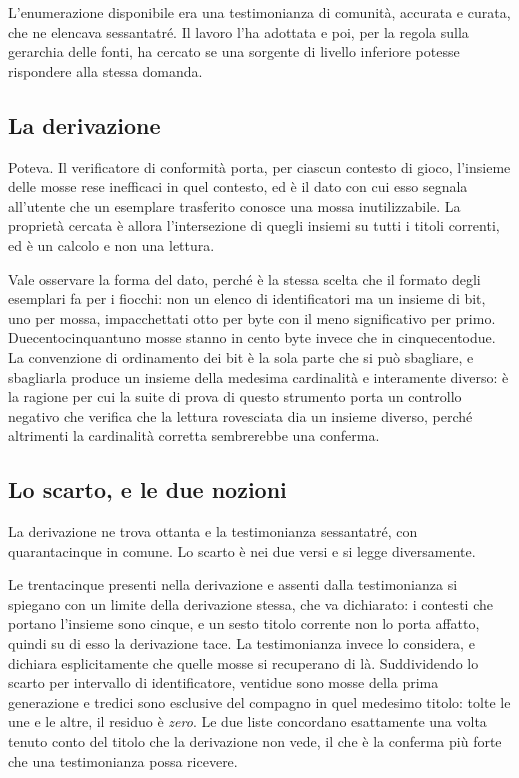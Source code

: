 L'enumerazione disponibile era una testimonianza di comunità, accurata e curata, che ne elencava sessantatré. Il lavoro l'ha adottata e poi, per la regola sulla gerarchia delle fonti, ha cercato se una sorgente di livello inferiore potesse rispondere alla stessa domanda.

\subsection{La derivazione}

Poteva. Il verificatore di conformità porta, per ciascun contesto di gioco, l'insieme delle mosse rese inefficaci in quel contesto, ed è il dato con cui esso segnala all'utente che un esemplare trasferito conosce una mossa inutilizzabile. La proprietà cercata è allora l'intersezione di quegli insiemi su tutti i titoli correnti, ed è un calcolo e non una lettura.

Vale osservare la forma del dato, perché è la stessa scelta che il formato degli esemplari fa per i fiocchi: non un elenco di identificatori ma un insieme di bit, uno per mossa, impacchettati otto per byte con il meno significativo per primo. Duecentocinquantuno mosse stanno in cento byte invece che in cinquecentodue. La convenzione di ordinamento dei bit è la sola parte che si può sbagliare, e sbagliarla produce un insieme della medesima cardinalità e interamente diverso: è la ragione per cui la suite di prova di questo strumento porta un controllo negativo che verifica che la lettura rovesciata dia un insieme diverso, perché altrimenti la cardinalità corretta sembrerebbe una conferma.

\subsection{Lo scarto, e le due nozioni}

La derivazione ne trova ottanta e la testimonianza sessantatré, con quarantacinque in comune. Lo scarto è nei due versi e si legge diversamente.

Le trentacinque presenti nella derivazione e assenti dalla testimonianza si spiegano con un limite della derivazione stessa, che va dichiarato: i contesti che portano l'insieme sono cinque, e un sesto titolo corrente non lo porta affatto, quindi su di esso la derivazione tace. La testimonianza invece lo considera, e dichiara esplicitamente che quelle mosse si recuperano di là. Suddividendo lo scarto per intervallo di identificatore, ventidue sono mosse della prima generazione e tredici sono esclusive del compagno in quel medesimo titolo: tolte le une e le altre, il residuo è \emph{zero}. Le due liste concordano esattamente una volta tenuto conto del titolo che la derivazione non vede, il che è la conferma più forte che una testimonianza possa ricevere.

